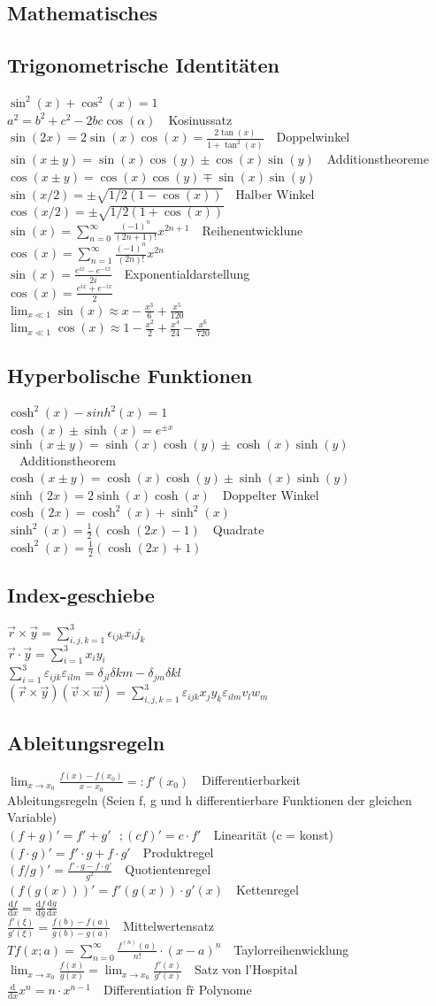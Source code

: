 \documentclass[8pt,a4paper]{extarticle}
\newcommand{\frml}[2]{$#1$~\hfill~#2\\}
\newcommand{\tder}[2]{\frac{\mathrm d #1}{\mathrm d #2}}
\begin{document}
\begin{multicols}{3}
\section{Mathematisches}
\subsection{Trigonometrische Identit\"aten}
\frml{\sin^2(x)+\cos^2(x) = 1}{}
\frml{a^2 = b^2+c^2 -2bc\cos(\alpha)}{Kosinussatz}
\frml{\sin(2x) = 2\sin(x)\cos(x) = \frac{2\tan(x)}{1+\tan^2(x)}}{Doppelwinkel}
\frml{\sin(x\pm y) = \sin(x)\cos(y)\pm\cos(x)\sin(y)}{Additionstheoreme}
\frml{\cos(x\pm y) = \cos(x)\cos(y)\mp\sin(x)\sin(y)}{}
\frml{\sin(x/2)=\pm\sqrt{1/2(1-\cos(x))}}{Halber Winkel}
\frml{\cos(x/2)=\pm\sqrt{1/2(1+\cos(x))}}{}
\frml{\sin(x)=\sum_{n=0}^{\infty}\frac{(-1)^n}{(2n+1)!}x^{2n+1}}{Reihenentwicklune}
\frml{\cos(x)=\sum_{n=1}^\infty\frac{(-1)^n}{(2n)!}x^{2n}}{}
\frml{\sin(x)=\frac{e^{ix}-e^{-ix}}{2i}}{Exponentialdarstellung}
\frml{\cos(x)=\frac{e^{ix}+e^{-ix}}{2}}{}
\frml{\lim_{x\ll1}{\sin(x)}\approx x-\frac{x^3}{6}+\frac{x^5}{120}}{}
\frml{\lim_{x\ll1}{\cos(x)}\approx1-\frac{x^2}{2}+\frac{x^4}{24}-\frac{x^6}{720}}{}
\subsection{Hyperbolische Funktionen}
\frml{\cosh^2(x)-sinh^2(x)=1}{}
\frml{\cosh(x)\pm\sinh(x)=e^{\pm x}}{}
\frml{\sinh(x\pm y)=\sinh(x)\cosh(y)\pm\cosh(x)\sinh(y)}{Additionstheorem}
\frml{\cosh(x\pm y)=\cosh(x)\cosh(y)\pm \sinh(x)\sinh(y)}{}
\frml{\sinh(2x)=2\sinh(x)\cosh(x)}{Doppelter Winkel}
\frml{\cosh(2x)=\cosh^2(x)+\sinh^2(x)}{}
\frml{\sinh^2(x)=\frac{1}{2}(\cosh(2x)-1)}{Quadrate}
\frml{\cosh^2(x)=\frac{1}{2}(\cosh(2x)+1)}{}
\subsection{Index-geschiebe}
\frml{\vec{r}\times\vec{y} = \sum_{i,j,k = 1}^3\epsilon_{ijk}x_{i}j_{k}}{}
\frml{\vec{r}\cdot\vec{y} = \sum_{i=1}^3x_{i}y_{i}}{}
\frml{\sum_{i=1}^3\varepsilon_{ijk}\varepsilon_{ilm} = \delta_{jl}\delta{km} - \delta_{jm}\delta{kl}}{}
\frml{(\vec{r}\times\vec{y})(\vec{v}\times\vec{w}) = \sum_{i,j,k=1}^3\varepsilon_{ijk}x_jy_k\varepsilon_{ilm}v_lw_m}{}
\subsection{Ableitungsregeln}
\frml{\lim_{x\to x_0}\frac{f(x)-f(x_0)}{x-x_0}=:f'(x_0)}{Differentierbarkeit}
Ableitungsregeln (Seien f, g und h differentierbare Funktionen der gleichen Variable)\\
\frml{(f+g)'=f'+g'\text{  }; (cf)'=c\cdot f'}{Linearit\"at (c = konst)}
\frml{(f\cdot g)'=f'\cdot g +f\cdot g'}{Produktregel}
\frml{(f/g)'=\frac{f'\cdot g-f\cdot g'}{g^2}}{Quotientenregel}
\frml{(f(g(x)))'=f'(g(x))\cdot g'(x)}{Kettenregel}
\frml{\tder{f}{x}=\tder{f}{g}\tder{g}{x}}{}
\frml{\frac{f'(\xi)}{g'(\xi)}=\frac{f(b)-f(a)}{g(b)-g(a)}}{Mittelwertensatz}
\frml{Tf(x;a)=\sum_{n=0}^\infty\frac{f^(n)(a)}{n!}\cdot (x-a)^n}{Taylorreihenwicklung}
\frml{\lim_{x\to x_0}\frac{f(x)}{g(x)}=\lim_{x\to x_0}\frac{f'(x)}{g'(x)}}{Satz von l'Hospital}
\frml{\tder{}{x}x^n = n\cdot x^{n-1}}{Differentiation f\"r Polynome}

\end{multicols}
\end{document}
